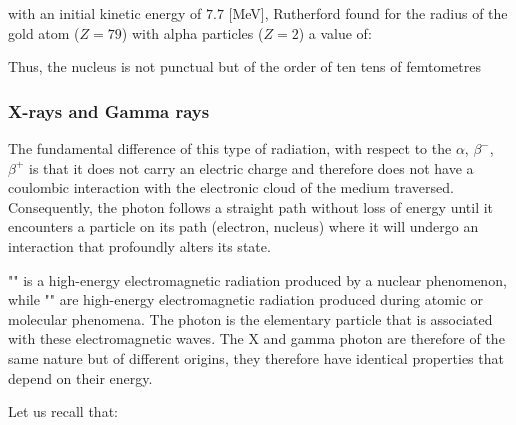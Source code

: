 	with an initial kinetic energy of $7.7$ [MeV], Rutherford found for the radius of the gold atom ($Z = 79$) with alpha particles ($Z = 2$) a value of:
	
	Thus, the nucleus is not punctual but of the order of ten tens of femtometres
	
	\subsubsection{X-rays and Gamma rays}
	The fundamental difference of this type of radiation, with respect to the $\alpha$, $\beta^-$, $\beta^+$ is that it does not carry an electric charge and therefore does not have a coulombic interaction with the electronic cloud of the medium traversed. Consequently, the photon follows a straight path without loss of energy until it encounters a particle on its path (electron, nucleus) where it will undergo an interaction that profoundly alters its state.

	"" is a high-energy electromagnetic radiation produced by a nuclear phenomenon, while "" are high-energy electromagnetic radiation produced during atomic or molecular phenomena. The photon is the elementary particle that is associated with these electromagnetic waves. The X and gamma photon are therefore of the same nature but of different origins, they therefore have identical properties that depend on their energy.

	Let us recall that:
	
